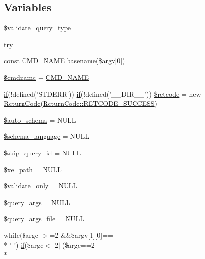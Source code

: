 \subsection*{Variables}
\begin{DoxyCompactItemize}
\item 
\hyperlink{validate_8php_a4dedc743cbf229659efcb0ad9f6c6cab}{\$validate\+\_\+query\+\_\+type}
\item 
\hyperlink{validate_8php_abe4cc9788f52e49485473dc699537388}{try}
\item 
const \hyperlink{validate_8php_a0b8cd04242aae1a86ebfb94e357edf41}{C\+M\+D\+\_\+\+N\+A\+M\+E} basename(\$argv\mbox{[}0\mbox{]})
\item 
\hyperlink{validate_8php_a45b77e89b244f7f9d70aac2006151525}{\$cmdname} = \hyperlink{validate_8php_a0b8cd04242aae1a86ebfb94e357edf41}{C\+M\+D\+\_\+\+N\+A\+M\+E}
\item 
\hyperlink{point__level__icon_8addon_8php_a29031816e50a8f742422e671b2bef9b2}{if}(!defined('S\+T\+D\+E\+R\+R')) \hyperlink{point__level__icon_8addon_8php_a29031816e50a8f742422e671b2bef9b2}{if}(!defined('\+\_\+\+\_\+\+D\+I\+R\+\_\+\+\_\+')) \hyperlink{validate_8php_a87d4dc54461ff155cd633f2ece7cd9e4}{\$retcode} = new \hyperlink{classReturnCode}{Return\+Code}(\hyperlink{classReturnCode_a1bfbc40c7a81cff70d885541bde528bd}{Return\+Code\+::\+R\+E\+T\+C\+O\+D\+E\+\_\+\+S\+U\+C\+C\+E\+S\+S})
\item 
\hyperlink{validate_8php_aeb18ba5c86f2000ce5dd010acff58413}{\$auto\+\_\+schema} = N\+U\+L\+L
\item 
\hyperlink{validate_8php_a8da6d5929566e961bc11f25104519c1a}{\$schema\+\_\+language} = N\+U\+L\+L
\item 
\hyperlink{validate_8php_a33587a1c0ee8a26e80e32ffac472df40}{\$skip\+\_\+query\+\_\+id} = N\+U\+L\+L
\item 
\hyperlink{validate_8php_aa5ad575ad128f7157c6336775537072e}{\$xe\+\_\+path} = N\+U\+L\+L
\item 
\hyperlink{validate_8php_a0e24775f133afa5748f8510c4a76f993}{\$validate\+\_\+only} = N\+U\+L\+L
\item 
\hyperlink{validate_8php_a7a7edb3be73e5594d8856ac68aecd5ca}{\$query\+\_\+args} = N\+U\+L\+L
\item 
\hyperlink{validate_8php_a809bf1b50077e0d0a61a22a9c29e45f2}{\$query\+\_\+args\+\_\+file} = N\+U\+L\+L
\item 
while(\$argc $>$=2 \&\&\$argv\mbox{[}1\mbox{]}\mbox{[}0\mbox{]}== \\*
'-\/') \hyperlink{point__level__icon_8addon_8php_a29031816e50a8f742422e671b2bef9b2}{if}(\$argc$<$ 2$\vert$$\vert$(\$argc==2 \\*
$$
\end{DoxyCompactItemize}
